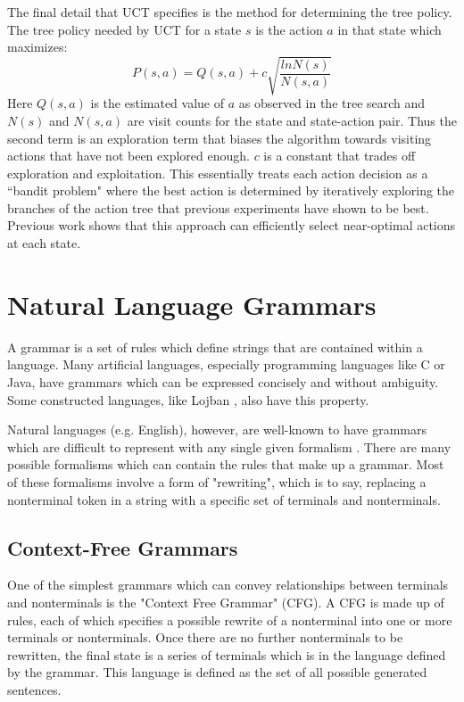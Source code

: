 The final detail that UCT specifies is the method for determining the tree policy.
The tree policy needed by UCT for a state $s$ is the action $a$ in that state which maximizes:
\begin{equation}
P(s,a) = Q(s,a) + c\sqrt{\frac{ln N(s)}{N(s,a)}}\label{eqn:uct}
\end{equation}
Here $Q(s,a)$ is the estimated value of $a$ as observed in the tree
search and $N(s)$ and $N(s,a)$ are visit counts for the state and
state-action pair. Thus the second term is an exploration term that
biases the algorithm towards visiting actions that have not been
explored enough. $c$ is a constant that trades off exploration and
exploitation. This essentially treats each action decision
as a ``bandit problem" where the best action is determined by iteratively
exploring the branches of the action tree that previous experiments
have shown to be best.  Previous work \cite{uct-go} shows that this approach can
efficiently select near-optimal actions at each state.


\section{Natural Language Grammars}

A grammar is a set of rules which define strings that are contained within a language.
Many artificial languages, especially programming languages like C or Java, have
grammars which can be expressed concisely and without ambiguity.  Some
constructed languages, like Lojban \cite{lojban}, also have this property.

Natural languages (e.g. English), however, are well-known to have grammars which are difficult
to represent with any single given formalism \cite{klein2012context}. There are many possible
formalisms which can contain the rules that make up
a grammar.  Most of these formalisms involve a form of "rewriting", which
is to say, replacing a nonterminal token in a string with a specific set of
terminals and nonterminals.

\subsection{Context-Free Grammars}

One of the simplest grammars which can convey relationships between terminals
and nonterminals is the "Context Free Grammar" (CFG).  A CFG is made up of rules,
each of which specifies a possible rewrite of a nonterminal into one or more
terminals or nonterminals.  Once there are no further nonterminals to be rewritten,
the final state is a series of terminals which is in the language defined by the grammar.
This language is defined as the set of all possible generated sentences.

